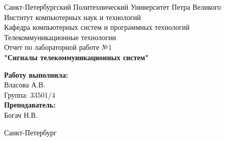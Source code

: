 \documentclass[a4paper]{article}
\begin{document}

\begin{titlepage}	%

	\begin{center}		%

		\large Санкт-Петербургский Политехнический Университет Петра Великого\\
		\large Институт компьютерных наук и технологий \\
		\large Кафедра компьютерных систем и программных технологий\\[6cm]
		
		\huge Телекоммуникационные технологии\\[0.5cm] %
		\large Отчет по лабораторной работе №1 \\[0.1cm]
		\large\textbf{"Сигналы телекоммуникационных систем"}\\[5cm]

	\end{center}


	\begin{flushright} %
		\begin{minipage}{0.25\textwidth} %
			\begin{flushleft} %

				\large\textbf{Работу выполнила:}\\
				\large Власова А.В.\\
				\large {Группа:} 33501/4\\
				
				\large \textbf{Преподаватель:}\\
				\large Богач Н.В.\

			\end{flushleft}
		\end{minipage}
	\end{flushright}
	
	\vfill %

	\begin{center}
	\large Санкт-Петербург\\
	\large \the\year %
	\end{center} %

\thispagestyle{empty} %
\end{titlepage} %
\end{document}
